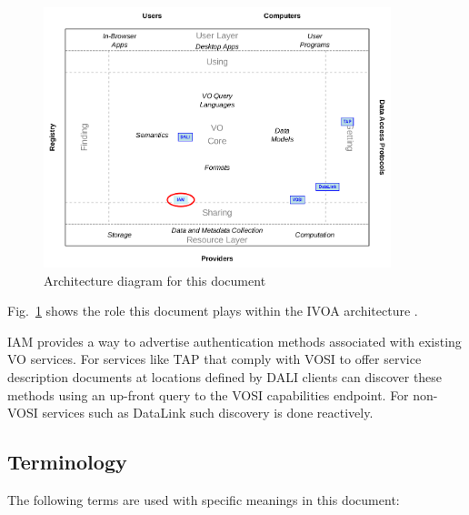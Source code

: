 \documentclass[11pt,a4paper]{ivoa}
\begin{document}
\begin{figure}
\centering


\includegraphics[width=0.9\textwidth]{role_diagram.pdf}
\caption{Architecture diagram for this document}
\label{fig:archdiag}
\end{figure}

Fig.~\ref{fig:archdiag} shows the role this document plays within the
IVOA architecture \citep{2021ivoa.spec.1101D}.

IAM provides a way to advertise authentication methods
associated with existing VO services.
For services like TAP \citep{2019ivoa.spec.0927D}
that comply with VOSI \citep{2017ivoa.spec.0524G} to
offer service description documents at locations
defined by DALI \citep{2017ivoa.spec.0517D}
clients can discover these methods
using an up-front query to the VOSI capabilities endpoint.
For non-VOSI services such as DataLink \citep{2015ivoa.spec.0617D}
such discovery is done reactively.


\subsection{Terminology}

The following terms are used with specific meanings in this document:
\end{document}
